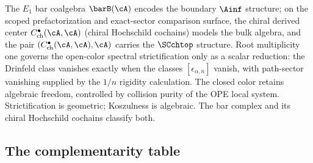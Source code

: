 \begin{remark}
The $E_1$ bar coalgebra $\barB(\cA)$ encodes the boundary $\Ainf$
structure; on the scoped prefactorization and exact-sector comparison
surface, the chiral derived center
$C^\bullet_{\mathrm{ch}}(\cA,\cA)$ (chiral Hochschild cochains)
models the bulk algebra, and the pair
$(C^\bullet_{\mathrm{ch}}(\cA,\cA), \cA)$ carries the $\SCchtop$
structure. Root multiplicity one governs the open-color spectral
strictification only as a scalar reduction: the Drinfeld class
vanishes exactly when the classes $[\epsilon_{\alpha,n}]$ vanish, with
path-sector vanishing supplied by the $1/n$ rigidity calculation. The closed color
retains algebraic freedom, controlled by collision purity of the
OPE local system. Strictification is geometric; Koszulness is
algebraic. The bar complex and its chiral Hochschild cochains
classify both.
\end{remark}

\subsection{The complementarity table}

